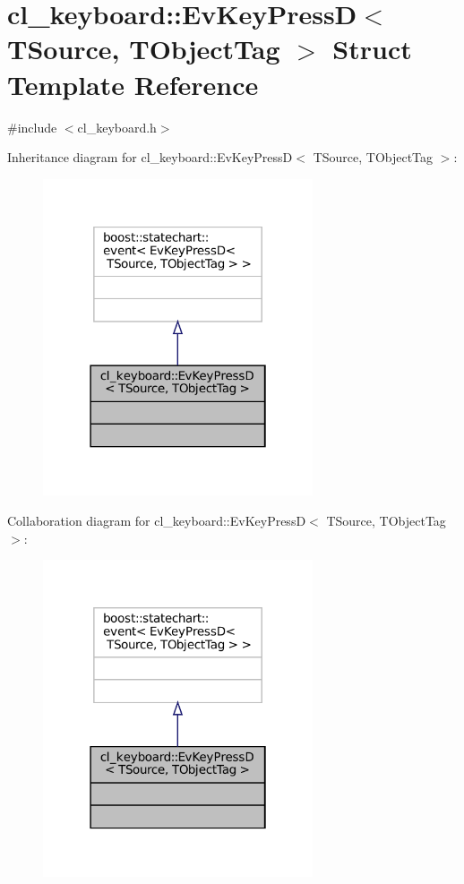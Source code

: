 \hypertarget{structcl__keyboard_1_1EvKeyPressD}{}\section{cl\+\_\+keyboard\+:\+:Ev\+Key\+PressD$<$ T\+Source, T\+Object\+Tag $>$ Struct Template Reference}
\label{structcl__keyboard_1_1EvKeyPressD}


{\ttfamily \#include $<$cl\+\_\+keyboard.\+h$>$}



Inheritance diagram for cl\+\_\+keyboard\+:\+:Ev\+Key\+PressD$<$ T\+Source, T\+Object\+Tag $>$\+:
\nopagebreak
\begin{figure}[H]
\begin{center}
\leavevmode
\includegraphics[width=226pt]{structcl__keyboard_1_1EvKeyPressD__inherit__graph}
\end{center}
\end{figure}


Collaboration diagram for cl\+\_\+keyboard\+:\+:Ev\+Key\+PressD$<$ T\+Source, T\+Object\+Tag $>$\+:
\nopagebreak
\begin{figure}[H]
\begin{center}
\leavevmode
\includegraphics[width=226pt]{structcl__keyboard_1_1EvKeyPressD__coll__graph}
\end{center}
\end{figure}


